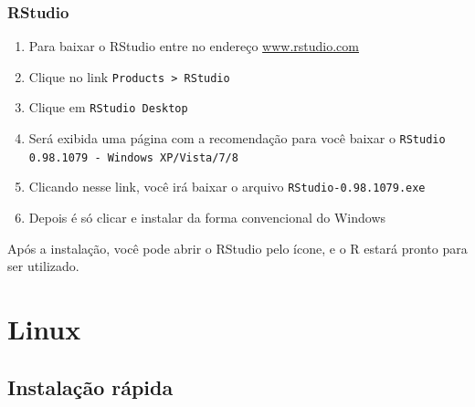 \documentclass[a4paper,12pt]{article}\usepackage[]{graphicx}\usepackage[]{color}
\providecommand{\R}{\textsf{R}\xspace}
\providecommand{\RStudio}{\textsf{RStudio}\xspace}
\begin{document}
\subsubsection{\RStudio}

\begin{enumerate}
\item Para baixar o \RStudio entre no endereço
  \url{www.rstudio.com}
\item Clique no link \texttt{Products > RStudio}
\item Clique em \texttt{RStudio Desktop}
\item Será exibida uma página com a recomendação para você baixar o
  \texttt{RStudio 0.98.1079 - Windows XP/Vista/7/8}
\item Clicando nesse link, você irá baixar o arquivo
  \texttt{RStudio-0.98.1079.exe}
\item Depois é só clicar e instalar da forma convencional do Windows
\end{enumerate}

Após a instalação, você pode abrir o \RStudio pelo ícone, e o \R estará
pronto para ser utilizado.

\section{Linux}

\subsection{Instalação rápida}
\label{sec:irl}
\end{document}
